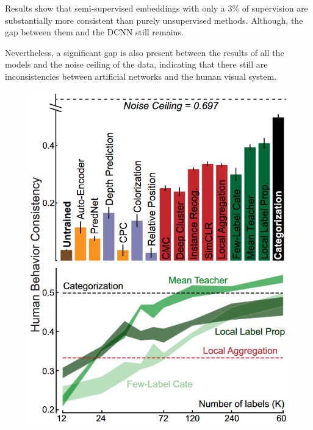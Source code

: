 \begin{casestudy}
\begin{descriptionlist}
            Results show that semi-supervised embeddings with only a $3\%$ of supervision are substantially more consistent than purely unsupervised methods.
            Although, the gap between them and the DCNN still remains.

            Nevertheless, a significant gap is also present between the results of all the models and the noise ceiling of the data, 
            indicating that there still are inconsistencies between artificial networks and the human visual system.

            \begin{figure}[H]
                \centering
                \includegraphics[width=0.40\linewidth]{./img/unsupervised_embedding4.png}
            \end{figure}
    \end{descriptionlist}
\end{casestudy}